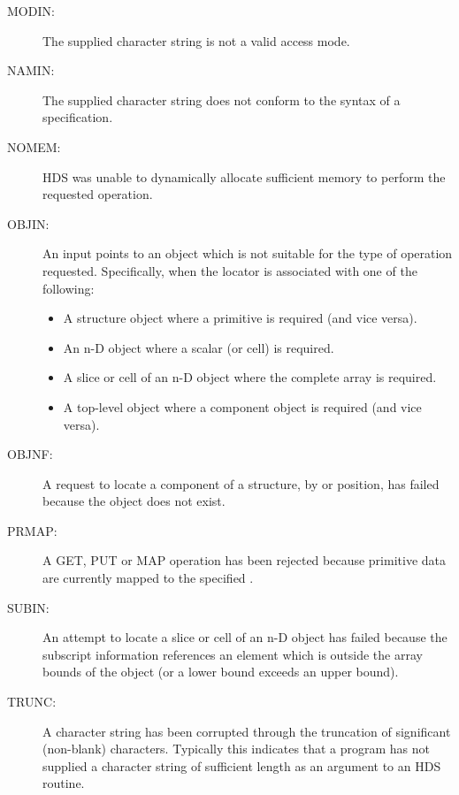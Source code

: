 \documentclass[twoside,11pt]{starlink}
\begin{document}
\begin{description}
\begin{itemize}
\end{itemize}

\item [MODIN:]
The supplied character string is not a valid access mode.

\item [NAMIN:]
The supplied character string does not conform to the syntax of a 
specification.

\item [NOMEM:]
HDS was unable to dynamically allocate sufficient memory to perform the
requested operation.

\item [OBJIN:]
An input  points to an object which is not suitable for the type of
operation requested. Specifically, when the locator is associated with one of
the following:

\begin{itemize}

\item A structure object where a primitive is required (and vice versa).

\item An n-D object where a scalar (or cell) is required.

\item A slice or cell of an n-D object where the complete array is required.

\item A top-level object where a component object is required (and vice versa).

\end{itemize}

\item [OBJNF:]
A request to locate a component of a structure, by  or position, has failed
because the object does not exist.

\item [PRMAP:]
A GET, PUT or MAP operation has been rejected because primitive data are
currently mapped to the specified .

\item [SUBIN:]
An attempt to locate a slice or cell of an n-D object has failed because the
subscript information references an element which is outside the array bounds
of the object (or a lower bound exceeds an upper bound).

\item [TRUNC:]
A character string has been corrupted through the truncation of significant
(non-blank) characters. Typically this indicates that a program has not
supplied a character string of sufficient length as an argument to an HDS
routine.


\end{description}
\end{document}
